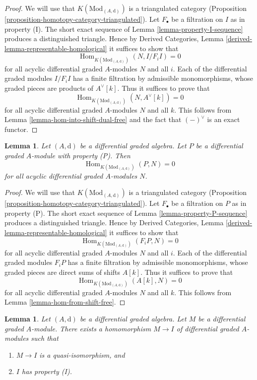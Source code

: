 \documentclass{stacks-project}
\theoremstyle{plain}
\newtheorem{lemma}[subsection]{Lemma}
\theoremstyle{definition}
\theoremstyle{remark}
\numberwithin{equation}{subsection}
\def\Hom{\mathop{\mathrm{Hom}}\nolimits}
\begin{document}
\begin{proof}
We will use that $K(\text{Mod}_{(A, \text{d})})$ is a triangulated
category (Proposition \ref{proposition-homotopy-category-triangulated}).
Let $F_\bullet$ be a filtration on $I$ as in property (I).
The short exact sequence of Lemma \ref{lemma-property-I-sequence}
produces a distinguished triangle. Hence by
Derived Categories, Lemma \ref{derived-lemma-representable-homological}
it suffices to show that
$$
\Hom_{K(\text{Mod}_{(A, \text{d})})}(N, I/F_iI) = 0
$$
for all acyclic differential graded $A$-modules $N$ and all $i$.
Each of the differential graded modules $I/F_iI$ has a finite filtration
by admissible monomorphisms, whose graded pieces are
products of $A^\vee[k]$. Thus it suffices to prove that
$$
\Hom_{K(\text{Mod}_{(A, \text{d})})}(N, A^\vee[k]) = 0
$$
for all acyclic differential graded $A$-modules $N$ and all $k$.
This follows from Lemma \ref{lemma-hom-into-shift-dual-free}
and the fact that $(-)^\vee$ is an exact functor.
\end{proof}

\begin{lemma}
\label{lemma-property-P-K-projective}
Let $(A, \text{d})$ be a differential graded algebra.
Let $P$ be a differential graded $A$-module with property (P).
Then
$$
\Hom_{K(\text{Mod}_{(A, \text{d})})}(P, N) = 0
$$
for all acyclic differential graded $A$-modules $N$.
\end{lemma}

\begin{proof}
We will use that $K(\text{Mod}_{(A, \text{d})})$ is a triangulated
category (Proposition \ref{proposition-homotopy-category-triangulated}).
Let $F_\bullet$ be a filtration on $P$ as in property (P).
The short exact sequence of Lemma \ref{lemma-property-P-sequence}
produces a distinguished triangle. Hence by
Derived Categories, Lemma \ref{derived-lemma-representable-homological}
it suffices to show that
$$
\Hom_{K(\text{Mod}_{(A, \text{d})})}(F_iP, N) = 0
$$
for all acyclic differential graded $A$-modules $N$ and all $i$.
Each of the differential graded modules $F_iP$ has a finite filtration
by admissible monomorphisms, whose graded pieces are direct sums
of shifts $A[k]$. Thus it suffices to prove that
$$
\Hom_{K(\text{Mod}_{(A, \text{d})})}(A[k], N) = 0
$$
for all acyclic differential graded $A$-modules $N$ and all $k$.
This follows from Lemma \ref{lemma-hom-from-shift-free}.
\end{proof}

\begin{lemma}
\label{lemma-right-resolution}
Let $(A, \text{d})$ be a differential graded algebra.
Let $M$ be a differential graded $A$-module. There exists a homomorphism
$M \to I$ of differential graded $A$-modules such that
\begin{enumerate}
\item $M \to I$ is a quasi-isomorphism, and
\item $I$ has property (I).
\end{enumerate}
\end{lemma}
\end{document}
